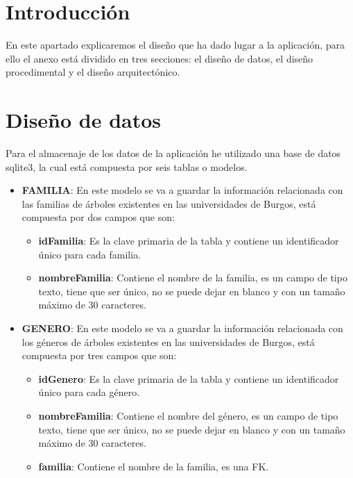 
\section{Introducción}

En este apartado explicaremos el diseño que ha dado lugar a la aplicación, para ello el anexo está dividido en tres secciones: el diseño de datos, el diseño procedimental y el diseño arquitectónico.

\section{Diseño de datos}

Para el almacenaje de los datos de la aplicación he utilizado una base de datos sqlite3, la cual está compuesta por seis tablas o modelos.


\begin{itemize}
	\item \textbf{FAMILIA}: En este modelo se va a guardar la información relacionada con las familias de árboles existentes en las universidades de Burgos, está compuesta por dos campos que son:
	\begin{itemize}
		\item \textbf{idFamilia}: Es la clave primaria de la tabla y contiene un identificador único para cada familia.
		\item \textbf{nombreFamilia}: Contiene el nombre de la familia, es un campo de tipo texto, tiene que ser único, no se puede dejar en blanco y con un tamaño máximo de 30 caracteres. 
	\end{itemize}
\end{itemize}


\begin{itemize}
	\item \textbf{GENERO}: En este modelo se va a guardar la información relacionada con los géneros de árboles existentes en las universidades de Burgos, está compuesta por tres campos que son:
	\begin{itemize}
		\item \textbf{idGenero}: Es la clave primaria de la tabla y contiene un identificador único para cada género.
		\item \textbf{nombreFamilia}: Contiene el nombre del género, es un campo de tipo texto, tiene que ser único, no se puede dejar en blanco y con un tamaño máximo de 30 caracteres. 
		\item \textbf{familia}: Contiene el nombre de la familia, es una FK.
	\end{itemize}
\end{itemize}

